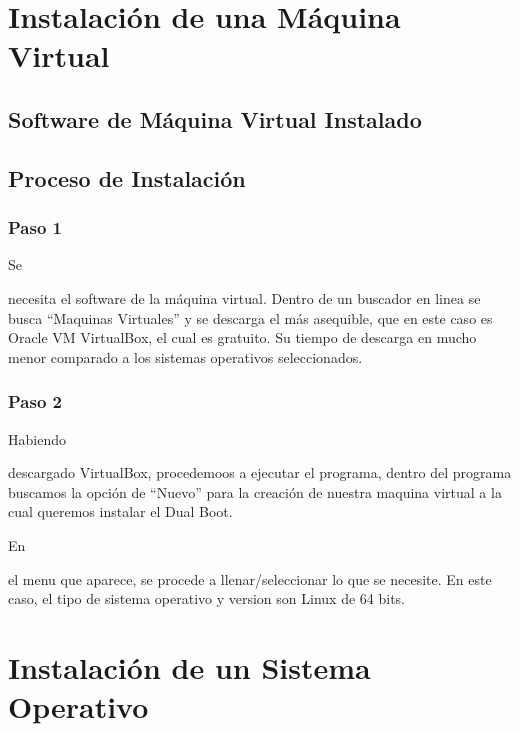 \documentclass[stu, 12pt, letterpaper, donotrepeattitle, floatsintext, natbib]{apa7}
\begin{document}
    \section*{Instalación de una Máquina Virtual}
    \subsection*{Software de Máquina Virtual Instalado}
    \subsection*{Proceso de Instalación}
    \subsubsection*{Paso 1}
    Se \begin{justifying}
      necesita el software de la máquina virtual. Dentro de un buscador en linea se busca ``Maquinas Virtuales'' y se descarga el más asequible, que 
    en este caso es Oracle VM VirtualBox, el cual es gratuito. Su tiempo de descarga en mucho menor comparado a los sistemas operativos seleccionados.\par
    \end{justifying}
    \vspace{\baselineskip}
    \subsubsection*{Paso 2}
    Habiendo \begin{justifying}
      descargado VirtualBox, procedemoos a ejecutar el programa, dentro del programa buscamos la opción de ``Nuevo'' para la creación
    de nuestra maquina virtual a la cual queremos instalar el Dual Boot.\par
    \end{justifying}
    En \begin{justifying}
      el menu que aparece, se procede a llenar/seleccionar lo que se necesite. En este caso, el tipo de sistema operativo y version son Linux de 64 bits.\par
    \end{justifying}
    \section*{Instalación de un Sistema Operativo}
\end{document}
